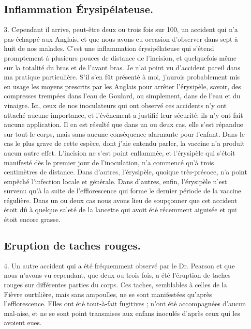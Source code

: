 \subsection{Inflammation Érysipélateuse.}
3. Cependant il arrive, peut-être deux ou trois fois sur 100, un accident qui n’a pas échappé aux Anglais, et que nous avons eu occasion d’observer dans sept à huit de nos malades. C’est une inflammation érysipélateuse qui s’étend promptement à plusieurs pouces de distance de l’incision, et quelquefois même sur la totalité du bras et de l’avant bras. Je n’ai point vu d’accident pareil dans ma pratique particulière. S’il s’en fût présenté à moi, j’aurois probablement mis en usage les moyens prescrits par les Anglais pour arrêter l’érysipèle, savoir, des compresses trempées dans l’eau de Goulard, ou simplement, dans de l’eau et du vinaigre. Ici, ceux de nos inoculateurs qui ont observé ces accidents n’y ont attaché aucune importance, et l’événement a justifié leur sécurité; ils n’y ont fait aucune application. Il en est résulté que dans un ou deux cas, elle s’est répandue sur tout le corps, mais sans aucune conséquence alarmante pour l’enfant. Dans le cas le plus grave de cette espèce, dont j’aie entendu parler, la vaccine n’a produit aucun autre effet. L’incision ne s’est point enflammée, et l’érysipèle qui s’étoit manifesté dès le premier jour de l’inoculation, n’a commencé qu’à trois centimètres\setcounter{page}{83} de distance. Dans d'autres, l'érysipèle, quoique très-précoce, n'a point empêché l'infection locale et générale. Dans d'autres, enfin, l'érysipèle n'est survenu qu'à la suite de l'efflorescence qui forme le dernier période de la vaccine régulière. Dans un ou deux cas nous avons lieu de soupçonner que cet accident étoit dû à quelque saleté de la lancette qui avoit été récemment aiguisée et qui étoit encore grasse.
\subsection{Eruption de taches rouges.}
4. Un autre accident qui a été fréquemment observé par le Dr. Pearson et que nous n'avons vu cependant, que deux ou trois fois, a été l'éruption de taches rouges sur différentes parties du corps. Ces taches, semblables à celles de la Fièvre ourtilière, mais sans ampoulles, ne se sont manifestées qu'après l'efflorescence. Elles ont été tout-à-fait fugitives ; n'ont été accompagnées d'aucun mal-aise, et ne se sont point transmises aux enfans inoculés d'après ceux qui les avoient eues.
